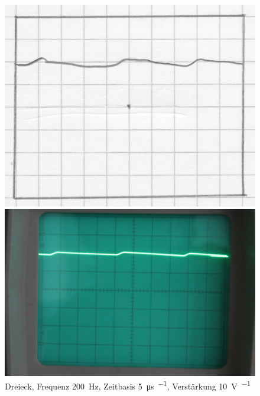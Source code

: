\begin{figure}[htbp]
	\centering
	\begin{minipage}{.45\linewidth}
	\includegraphics[width=\linewidth]{Oszi_Hand/793.jpg}
	\end{minipage}
	\hfill
	\begin{minipage}{.45\linewidth}
	\includegraphics[width=\linewidth]{Oszi_Foto/793.jpg}
	\end{minipage}
	\caption{%
		Dreieck, Frequenz \SI{200}{\hertz},
		Zeitbasis \SI{5}{\micro\second\per\division},
		Verstärkung \SI{10}{\volt\per\division}
	}
	\label{fig:793}
\end{figure}

